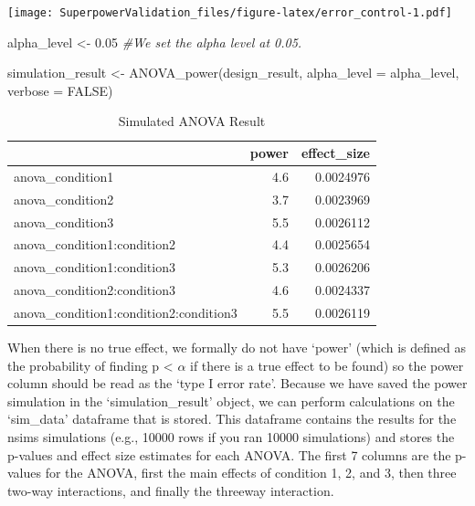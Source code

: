 \documentclass[
]{book}
\newenvironment{Shaded}{\begin{snugshade}}{\end{snugshade}}
\newcommand{\AttributeTok}[1]{\textcolor[rgb]{0.77,0.63,0.00}{#1}}
\newcommand{\CommentTok}[1]{\textcolor[rgb]{0.56,0.35,0.01}{\textit{#1}}}
\newcommand{\ConstantTok}[1]{\textcolor[rgb]{0.00,0.00,0.00}{#1}}
\newcommand{\FloatTok}[1]{\textcolor[rgb]{0.00,0.00,0.81}{#1}}
\newcommand{\FunctionTok}[1]{\textcolor[rgb]{0.00,0.00,0.00}{#1}}
\newcommand{\NormalTok}[1]{#1}
\newcommand{\OtherTok}[1]{\textcolor[rgb]{0.56,0.35,0.01}{#1}}
\begin{document}
\texttt{[image: SuperpowerValidation\_files/figure-latex/error\_control-1.pdf]}

\begin{Shaded}
\begin{Highlighting}[]
\NormalTok{alpha\_level }\OtherTok{\textless{}{-}} \FloatTok{0.05}
\CommentTok{\#We set the alpha level at 0.05. }
\end{Highlighting}
\end{Shaded}

\begin{Shaded}
\begin{Highlighting}[]
\NormalTok{simulation\_result }\OtherTok{\textless{}{-}} \FunctionTok{ANOVA\_power}\NormalTok{(design\_result,}
                                 \AttributeTok{alpha\_level =}\NormalTok{ alpha\_level,}
                                 \AttributeTok{verbose =} \ConstantTok{FALSE}\NormalTok{)}
\end{Highlighting}
\end{Shaded}

\begin{table}[!h]

\caption{\label{tab:unnamed-chunk-259}Simulated ANOVA Result}
\centering
\begin{tabular}[t]{l|r|r}
\hline
  & power & effect\_size\\
\hline
anova\_condition1 & 4.6 & 0.0024976\\
\hline
anova\_condition2 & 3.7 & 0.0023969\\
\hline
anova\_condition3 & 5.5 & 0.0026112\\
\hline
anova\_condition1:condition2 & 4.4 & 0.0025654\\
\hline
anova\_condition1:condition3 & 5.3 & 0.0026206\\
\hline
anova\_condition2:condition3 & 4.6 & 0.0024337\\
\hline
anova\_condition1:condition2:condition3 & 5.5 & 0.0026119\\
\hline
\end{tabular}
\end{table}

When there is no true effect, we formally do not have `power' (which is defined as the probability of finding p \textless{} \(\alpha\) if there is a true effect to be found) so the power column should be read as the `type I error rate'. Because we have saved the power simulation in the `simulation\_result' object, we can perform calculations on the `sim\_data' dataframe that is stored. This dataframe contains the results for the nsims simulations (e.g., 10000 rows if you ran 10000 simulations) and stores the p-values and effect size estimates for each ANOVA. The first 7 columns are the p-values for the ANOVA, first the main effects of condition 1, 2, and 3, then three two-way interactions, and finally the threeway interaction.
\end{document}
